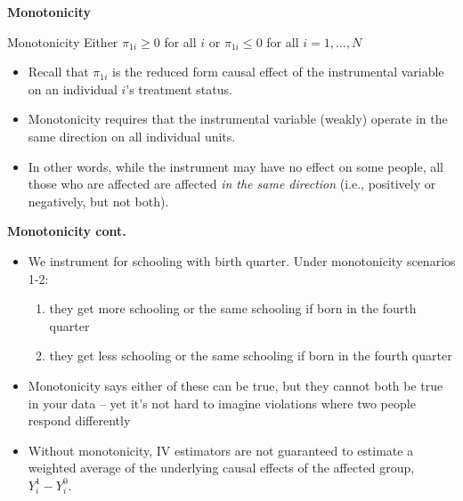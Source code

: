 \documentclass[notes=show]{beamer}
\begin{document}
\begin{frame}[plain]

	\begin{center}
	\textbf{Monotonicity}
	\end{center}
	
	\begin{block}{Monotonicity}
	Either $\pi_{1i}\geq{0}$ for all $i$ or $\pi_{1i}\leq{0}$ for all $i=1, \dots, N$
	\end{block}

\begin{itemize}

\item Recall that $\pi_{1i}$ is the reduced form causal effect of the instrumental variable on an individual $i$'s treatment status.  
\item Monotonicity requires that the instrumental variable (weakly) operate in the same direction on all individual units.  
\item In other words, while the instrument may have no effect on some people, all those who are affected are affected \emph{in the same direction} (i.e., positively or negatively, but not both).

\end{itemize}

\end{frame}

\begin{frame}[plain]
\begin{center}
\textbf{Monotonicity cont.}
\end{center}

\begin{itemize}
	
\item We instrument for schooling with birth quarter. Under monotonicity scenarios 1-2: 
	\begin{enumerate}
	\item they get more schooling or the same schooling if born in the fourth quarter
	\item they get less schooling or the same schooling if born in the fourth quarter
	\end{enumerate}
\item Monotonicity says either of these can be true, but they cannot both be true in your data -- yet it's not hard to imagine violations where two people respond differently  
\item Without monotonicity, IV estimators are not guaranteed to estimate a weighted average of the underlying causal effects of the affected group, $Y^1_{i} - Y^0_{i}$.
\end{itemize}

\end{frame}
\end{document}
